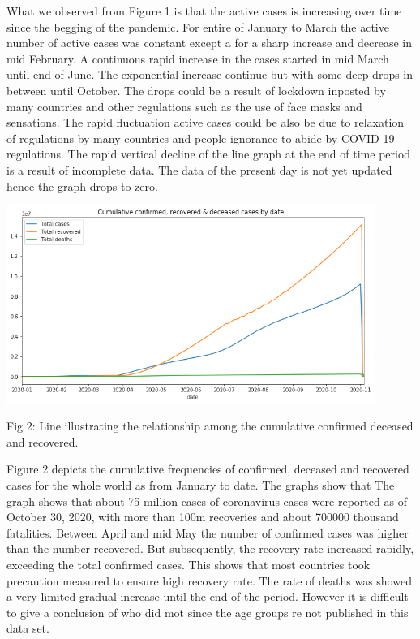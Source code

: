 \documentclass[12pt]{article}
\begin{document}
What we observed  from Figure 1 is that the active cases is increasing over time since the begging of the pandemic. For entire of January to March the active number of active cases was constant except a for a sharp increase and decrease in mid February. A continuous rapid increase in the cases started in mid March  until end of June. The exponential increase continue but with some deep drops in between until October.  The drops could be a result of lockdown inposted by many countries and other regulations such as the use of face masks and sensations. The  rapid  fluctuation  active cases could be also be due to relaxation of regulations by many countries and people ignorance to abide by COVID-19 regulations. The rapid vertical decline of the line graph at the end of time period is a result of incomplete data. The data of the present day is not yet updated hence the graph drops to zero. 


\includegraphics[width=0.9\textwidth, inner]{line2.png}
\caption{Fig 2: Line illustrating the relationship among the cumulative confirmed deceased and recovered.}

Figure 2 depicts the cumulative frequencies of confirmed, deceased and recovered cases for the whole world as from January to date.  The graphs show that
The graph shows that about 75 million cases of coronavirus cases were reported as of October 30, 2020, with more than 100m recoveries and about 700000 thousand fatalities. Between April and mid May the number of confirmed  cases was higher than the number recovered. But subsequently, the recovery rate increased rapidly, exceeding the total confirmed cases. This shows that most countries took precaution measured to ensure high recovery rate. The rate of deaths was showed a very limited gradual increase until the end of the period. However it is difficult to give a conclusion of who did mot since the age groups re not published in this data set.  
\end{document}
